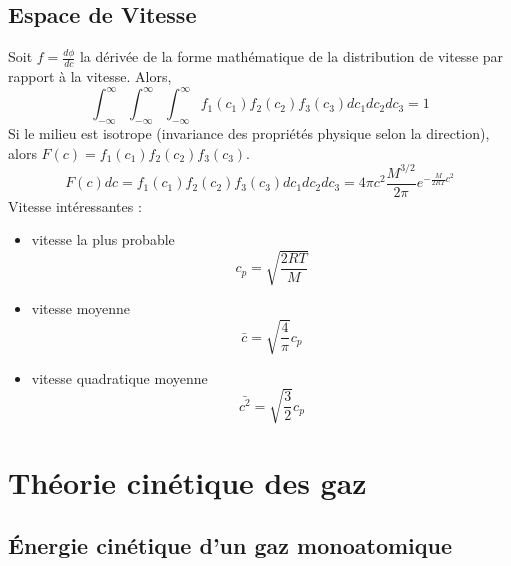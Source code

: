 \documentclass[12pt,a4paper,twoside]{report}
\begin{document}
\subsection{Espace de Vitesse}
Soit $f=\frac{d\phi}{dc}$ la dérivée de la forme mathématique de la distribution de vitesse par rapport à la vitesse. Alors, $$\int_{-\infty}^{\infty}{\int_{-\infty}^{\infty}{\int_{-\infty}^{\infty}{f_1(c_1)f_2(c_2)f_3(c_3)dc_1dc_2dc_3}}}=1$$
Si le milieu est isotrope (invariance des propriétés physique selon la direction), alors $F(c)=f_1(c_1)f_2(c_2)f_3(c_3)$.
$$F(c)dc=f_1(c_1)f_2(c_2)f_3(c_3)dc_1dc_2dc_3=4\pi c^{2} \frac{M^{3/2}}{2\pi} e^{-\frac{M}{2RT}c^{2}}$$
Vitesse intéressantes : 
\begin{itemize}
\item vitesse la plus probable $$c_p=\sqrt{\frac{2RT}{M}}$$
\item vitesse moyenne
$$\bar{c}=\sqrt{\frac{4}{\pi}}c_p$$
\item vitesse quadratique moyenne
$$\bar{c^{2}}=\sqrt{\frac{3}{2}}c_p$$
\end{itemize}
\section{Théorie cinétique des gaz}
\subsection{Énergie cinétique d'un gaz monoatomique}
\end{document}
